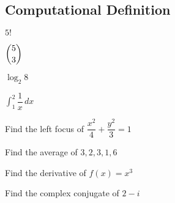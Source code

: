 \subsection{Computational Definition}

\begin{example}
  $5!$
\end{example}

\begin{example}
  $\dbinom{5}{3}$
\end{example}

\begin{example}
  $\log_2{8}$
\end{example}

\begin{example}
  $\displaystyle \int_1^2 \dfrac{1}{x} \, dx$
\end{example}

\begin{example}
  Find the left focus of $\dfrac{x^2}{4} + \dfrac{y^2}{3} = 1$
\end{example}

\begin{example}
  Find the average of $3, 2, 3, 1, 6$
\end{example}

\begin{example}
  Find the derivative of $f(x) = x^3$
\end{example}

\begin{example}
  Find the complex conjugate of $2 - i$
\end{example}
